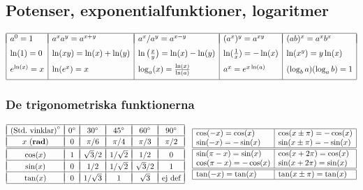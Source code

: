 \documentclass{article}
\begin{document}
\subsection*{Potenser, exponentialfunktioner, logaritmer}%


$\begin{array}{|l|l|l|l|l|}\hline
  &&&&\\*[-11pt]
  a^0=1 &a^xa^y=a^{x+y} &
  a^x/a^y=a^{x-y}&(a^x)^y=a^{xy} 
  & (ab)^x=a^xb^x 
\EndRow
  \ln(1)=0 &\ln(xy)=\ln(x)+\ln(y) &\ln\big(\frac{x}{y}\big)
  =\ln(x)-\ln(y) & 
  \ln(\frac1x) = -\ln(x) &
  \ln(x^y)=y\ln(x) 
\EndRow 
  e^{\ln(x)}=x & \ln(e^x)=x & \log_a(x)
  =\frac{\ln(x)}{\ln(a)} & a^x=e^{x\ln(a)} & 
  (\log_ba)(\log_ab) = 1
\EndRow
\hline\end{array}$%

\subsubsection*{De trigonometriska funktionerna}%

{%
\let\F\frac
\newcommand\CC[1]{#1^\circ}
\def\vPad{&&&&&\\*[-10pt]}
\def\myEnd{\\\hline\vPad}
\newcommand\tW{{\sqrt2}}
\newcommand\tH{{\sqrt3}}
$
\begin{array}{|c|c|c|c|c|c|}
\hline\vPad
\mbox{(Std.~vinklar)}^\circ
  & \CC{0} &\CC{30} &\CC{45} &\CC{60} &\CC{90}   %
 \myEnd
 x \mbox{ (\textbf{rad})}
        & 0     & \pi/6 & \pi/4 &  \pi/3 & \pi/2 %
 \\\hline\hline\vPad
 \cos(x)&   1   & \tH/2 & 1/\tW &  1/2  &   0    %
 \myEnd
 \sin(x)&   0   &   1/2 & 1/\tW & \tH/2 &   1    %
 \myEnd
 \tan(x)&   0   & 1/\tH &   1   & \tH   &
                                    \mbox{ej def}
 \\\hline
\end{array}
\quad
\begin{array}[m]{|l|l|}
\hline
  \cos(-x) = \cos(x)    & \cos(x\pm\pi) = -\cos(x) \\
  \sin(-x) = -\sin(x)   & \sin(x\pm\pi) = -\sin(x) \\
\hline
\hline
  \sin(\pi-x) = \sin(x) &  \cos(x+2\pi) = \cos(x) \\
  \cos(\pi-x) = -\cos(x)&  \sin(x+2\pi) = \sin(x) \\
\hline
\hline
 \tan(-x) = \tan(x)     & \tan(x\pm\pi) = \tan(x) \\
\hline
\end{array}
$
}%
\end{document}
